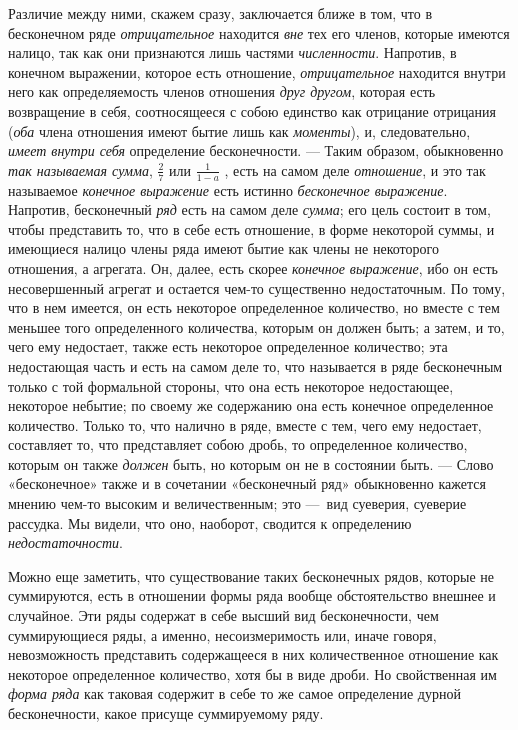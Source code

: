 {Различие между ними, скажем сразу, заключается ближе в том, что в
бесконечном ряде {\em отрицательное} находится
{\em вне} тех его членов, которые имеются налицо, так
как они признаются лишь частями {\em численности}.
Напротив, в конечном выражении, которое есть отношение,
{\em отрицательное} находится внутри него как
определяемость членов отношения {\em друг другом},
которая есть возвращение в себя, соотносящееся с собою единство как
отрицание отрицания ({\em оба} члена отношения имеют
бытие лишь как {\em моменты}), и, следовательно,
{\em имеет внутри себя} определение бесконечности. —
Таким образом, обыкновенно {\em так называемая сумма}, 
$\frac 2 7$  или  $\frac 1{1-a}$ , есть на самом деле
{\em отношение}, и это так называемое
{\em конечное выражение} есть истинно
{\em бесконечное выражение}. Напротив, бесконечный
{\em ряд} есть на самом деле
{\em сумма}; его цель состоит в том, чтобы представить
то, что в себе есть отношение, в форме некоторой суммы, и имеющиеся налицо
члены ряда имеют бытие как члены не некоторого отношения, а агрегата. Он,
далее, есть скорее {\em конечное выражение}, ибо он
есть несовершенный агрегат и остается чем-то существенно недостаточным. По
тому, что в нем имеется, он есть некоторое определенное количество, но
вместе с тем меньшее того определенного количества, которым он должен быть;
а затем, и то, чего ему недостает, также есть некоторое определенное
количество; эта недостающая часть и есть на самом деле то, что называется в
ряде бесконечным только с той формальной стороны, что она есть некоторое
недостающее, некоторое небытие; по своему же содержанию она есть конечное
определенное количество. Только то, что налично в ряде, вместе с тем, чего
ему недостает, составляет то, что представляет собою дробь, то определенное
количество, которым он также {\em должен} быть, но
которым он не в состоянии быть. — Слово «бесконечное» также и в сочетании
«бесконечный ряд» обыкновенно кажется мнению чем-то высоким и
величественным; это —~вид суеверия, суеверие рассудка. Мы видели, что оно,
наоборот, сводится к определению {\em недостаточности}.

Можно еще заметить, что существование таких бесконечных рядов, которые не
суммируются, есть в отношении формы ряда вообще обстоятельство внешнее и
случайное. Эти ряды содержат в себе высший вид бесконечности, чем
суммирующиеся ряды, а именно, несоизмеримость или, иначе говоря,
невозможность представить содержащееся в них количественное отношение как
некоторое определенное количество, хотя бы в виде дроби. Но свойственная им
{\em форма ряда} как таковая содержит в себе то же
самое определение дурной бесконечности, какое присуще суммируемому ряду.

}
